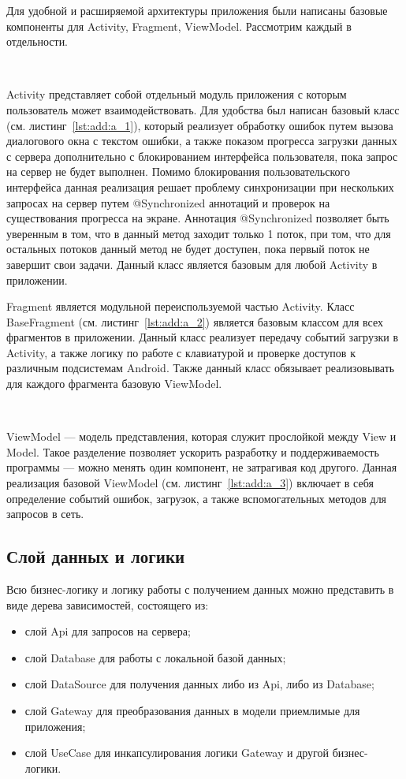 Для удобной и расширяемой архитектуры приложения были написаны базовые компоненты для Activity, Fragment, ViewModel. Рассмотрим каждый в отдельности.

~\par
Activity представляет собой отдельный модуль приложения с которым пользователь может взаимодействовать. Для удобства был написан базовый класс (см. листинг~\ref{lst:add:a_1}), который реализует обработку ошибок путем вызова диалогового окна с текстом ошибки, а также показом прогресса загрузки данных с сервера дополнительно с блокированием интерфейса пользователя, пока запрос на сервер не будет выполнен. Помимо блокирования пользовательского интерфейса данная реализация решает проблему синхронизации при нескольких запросах на сервер путем @Synchronized аннотаций и проверок на существования прогресса на экране. Аннотация @Synchronized позволяет быть уверенным в том, что в данный метод заходит только 1 поток, при том, что для остальных потоков данный метод не будет доступен, пока первый поток не завершит свои задачи. Данный класс является базовым для любой Activity в приложении.
~\par
Fragment является модульной переиспользуемой частью Activity. Класс BaseFragment (см. листинг~\ref{lst:add:a_2}) является базовым классом для всех фрагментов в приложении. Данный класс реализует передачу событий загрузки в Activity, а также логику по работе с клавиатурой и проверке доступов к различным подсистемам Android. Также данный класс обязывает реализовывать для каждого фрагмента базовую ViewModel.

~\par
ViewModel — модель представления, которая служит прослойкой между View и Model. Такое разделение позволяет ускорить разработку и поддерживаемость программы — можно менять один компонент, не затрагивая код другого. Данная реализация базовой ViewModel (см. листинг~\ref{lst:add:a_3}) включает в себя определение событий ошибок, загрузок, а также вспомогательных методов для запросов в сеть.

\subsection{Слой данных и логики}
Всю бизнес-логику и логику работы с получением данных можно представить в виде дерева зависимостей, состоящего из:

\begin{itemize}
  \item слой Api для запросов на сервера;
  \item слой Database для работы с локальной базой данных;
  \item слой DataSource для получения данных либо из Api, либо из Database;
  \item слой Gateway для преобразования данных в модели приемлимые для приложения;
  \item слой UseCase для инкапсулирования логики Gateway и другой бизнес-логики.
\end{itemize}

